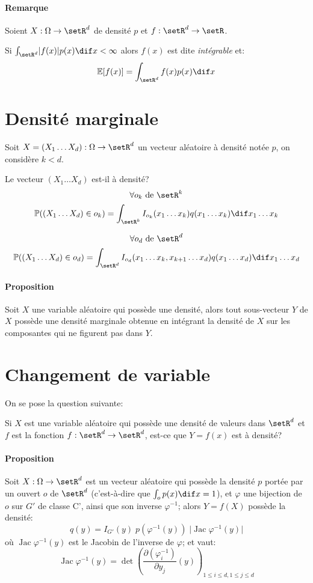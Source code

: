 \documentclass[a4paper,10pt,french,openany]{memoir}
\newcommand{\Proba}{\mathbb{P}}
\newcommand{\Esper}{\mathbb{E}}
\newcommand{\xoned}{x_1\dots x_d}
\newcommand{\Xoned}{X_1\dots X_d}
\newcommand{\xonek}{x_1\dots x_k}
\DeclareMathOperator{\jac}{Jac}
\begin{document}
\paragraph{Remarque}
Soient $X:\Omega \rightarrow \setR^d$ de densité $p$ et $f:\setR^d \rightarrow \setR$.

Si $\int_{\setR^d} \lvert f(x) \rvert p(x) \dif x < \infty$ alors $f(x)$ est dite \emph{intégrable} et:
\[ \Esper[f(x)] = \int_{\setR^d} f(x) p(x) \dif x \]

\section{Densité marginale}
Soit $X=(\Xoned):\Omega \rightarrow \setR^d$ un vecteur aléatoire à densité notée $p$, on considère $k<d$.

Le vecteur $(\Xoned)$ est-il à densité?
\[\forall o_k \text{ de }\setR^k\]
\[ \Proba((\Xoned) \in o_k) = \int_{\setR^k} I_{o_k}(\xonek) q(\xonek) \dif \xonek\]

\[\forall o_d \text{ de }\setR^d\]
\[\Proba((\Xoned) \in o_d) = \int_{\setR^d} I_{o_d}(x_1\dots x_k, x_{k+1}\dots x_d) q(\xoned) \dif \xoned\]

\paragraph{Proposition}
Soit $X$ une variable aléatoire qui possède une densité, alors tout sous-vecteur $Y$ de $X$ possède une densité marginale obtenue en intégrant la densité de $X$ sur les composantes qui ne figurent pas dans $Y$.

\section{Changement de variable}
On se pose la question suivante:
\begin{cquote}{}
 Si $X$ est une variable aléatoire qui possède une densité de valeurs dans $\setR^d$ et $f$ est la fonction $f:\setR^d \rightarrow \setR^d$, est-ce que $Y=f(x)$ est à densité?
\end{cquote}

\paragraph{Proposition}
Soit $X:\Omega \rightarrow \setR^d$ est un vecteur aléatoire qui possède la densité $p$ portée par un ouvert $o$ de $\setR^d$ (c'est-à-dire que $\int_o p(x) \dif x = 1$), et $\varphi$ une bijection de $o$ sur $G'$ de classe C', ainsi que son inverse $\varphi^{-1}$; alors $Y=f(X)$ possède la densité:
\[q(y) = I_{G'}(y)\;p(\varphi^{-1}(y)) \; \lvert \jac \varphi^{-1}(y) \rvert \]
où $\jac\varphi^{-1} (y)$ est le Jacobin de l'inverse de $\varphi$; et vaut:
\[ \jac \varphi^{-1}(y) = \det\left(\frac{\partial(\varphi^{-1}_i)}{\partial y_j}(y)\right)_{1\leq i\leq d, 1\leq j \leq d} \]
\end{document}
